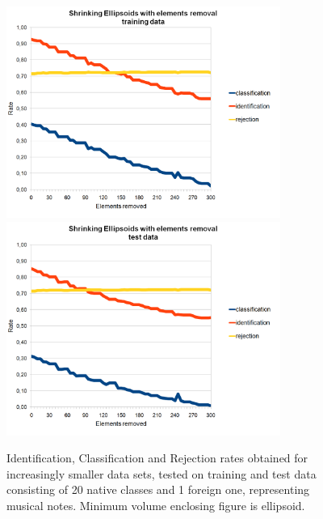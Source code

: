 \begin{figure}[htp]
	\centering
	\includegraphics[width=0.80\textwidth]{Figures/charts/MUSIC_NOTES/DIGITS_ShrinkingEllipsoidsElementsRemovalTraining.png}
	\hspace{12pt}
	\includegraphics[width=0.80\textwidth]{Figures/charts/MUSIC_NOTES/DIGITS_ShrinkingEllipsoidsElementsRemovalTest.png}
	\caption{ Identification, Classification and Rejection rates obtained for increasingly smaller data sets, tested on training and test data consisting of 20 native classes and 1 foreign one, representing musical notes. Minimum volume enclosing figure is ellipsoid. }
\end{figure}

